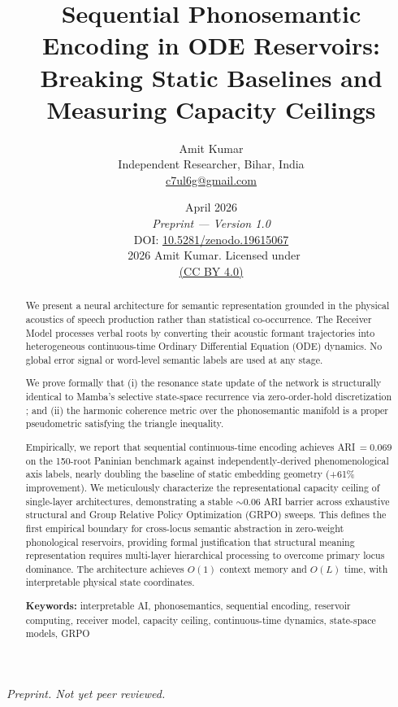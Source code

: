 \documentclass{article}
\title{\textbf{Sequential Phonosemantic Encoding in ODE Reservoirs:\\
Breaking Static Baselines and Measuring Capacity Ceilings}}
\author{Amit Kumar\\
\small Independent Researcher, Bihar, India\\
\small \href{mailto:c7ul6g@gmail.com}{c7ul6g@gmail.com}}
\date{%
  April 2026\\[4pt]
  \small\textit{Preprint — Version 1.0}\\[2pt]
  \small DOI: \href{https://doi.org/10.5281/zenodo.19615067}{10.5281/zenodo.19615067}\\[2pt]
  \small\textcopyright\ 2026 Amit Kumar. Licensed under\\
  \small\href{https://creativecommons.org/licenses/by/4.0/}{(CC BY 4.0)}%
}
\begin{document}
\maketitle

\begin{center}
\small\textit{Preprint. Not yet peer reviewed.}
\end{center}

\begin{abstract}
We present a neural architecture for semantic representation grounded in the physical acoustics of speech production rather than statistical co-occurrence. The Receiver Model processes verbal roots by converting their acoustic formant trajectories into heterogeneous continuous-time Ordinary Differential Equation (ODE) dynamics. No global error signal or word-level semantic labels are used at any stage.

We prove formally that (i) the resonance state update of the network is structurally identical to Mamba's selective state-space recurrence via zero-order-hold discretization \cite{gu2022mamba}; and (ii) the harmonic coherence metric over the phonosemantic manifold is a proper pseudometric satisfying the triangle inequality.

Empirically, we report that sequential continuous-time encoding achieves ARI\,$=0.069$ on the 150-root Paninian benchmark against independently-derived phenomenological axis labels, nearly doubling the baseline of static embedding geometry (+61\% improvement). We meticulously characterize the representational capacity ceiling of single-layer architectures, demonstrating a stable $\sim0.06$ ARI barrier across exhaustive structural and Group Relative Policy Optimization (GRPO) sweeps. This defines the first empirical boundary for cross-locus semantic abstraction in zero-weight phonological reservoirs, providing formal justification that structural meaning representation requires multi-layer hierarchical processing to overcome primary locus dominance. The architecture achieves $O(1)$ context memory and $O(L)$ time, with interpretable physical state coordinates.

\smallskip
\noindent\textbf{Keywords:} interpretable AI, phonosemantics, sequential encoding, reservoir computing, receiver model, capacity ceiling, continuous-time dynamics, state-space models, GRPO
\end{abstract}

\vspace{1em}
\end{document}

